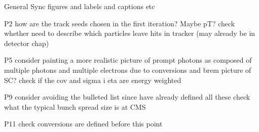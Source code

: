 General
Sync figures and labels and captions etc

P2
how are the track seeds chosen in the first iteration? Maybe pT?
check whether need to describe which particles leave hits in tracker (may already be in detector chap)

P5
consider painting a more realistic picture of prompt photons as composed of multiple photons 
and multiple electrons due to conversions and brem
picture of SC?
check if the cov and sigma i eta are energy weighted 

P9
consider avoiding the bulleted list since have already defined all these
check what the typical bunch spread size is at CMS

P11
check conversions are defined before this point
